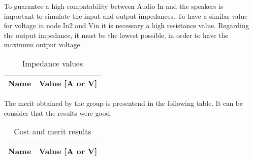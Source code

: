 \par To guarantee a high compatability between Audio In and the speakers is important to simulate the input and output impedances. To have a similar value for voltage in node In2 and Vin it is necessary a high resistance value. Regarding the output impedance, it must be the lowest possible, in order to have the maximum output voltage.

\begin{table}[!ht]
  \centering
  \begin{tabular}{|l|r|}
    \hline    
    {\bf Name} & {\bf Value [A or V]} \\ \hline
    
  \end{tabular}
  \caption{Impedance values}
  \label{tab:ng5}
\end{table}

\par The merit obtained by the group is presentend in the following table. It can be consider that the results were good.

\begin{table}[!ht]
  \centering
  \begin{tabular}{|l|r|}
    \hline    
    {\bf Name} & {\bf Value [A or V]} \\ \hline
    
  \end{tabular}
  \caption{Cost and merit results}
  \label{tab:ngs1}
\end{table}


